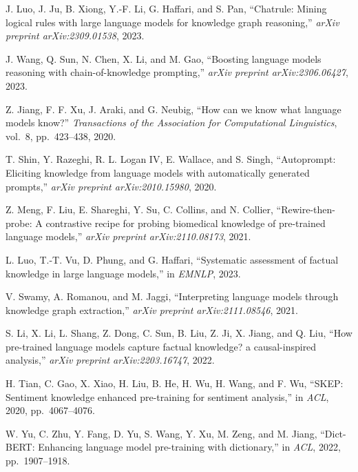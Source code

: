 \begin{enumerate}[leftmargin=2em,label={[\arabic*]}]
\item J. Luo, J. Ju, B. Xiong, Y.-F. Li, G. Haffari, and S. Pan, ``Chatrule: Mining logical rules with large language models for knowledge graph reasoning,'' \textit{arXiv preprint arXiv:2309.01538}, 2023.

\item J. Wang, Q. Sun, N. Chen, X. Li, and M. Gao, ``Boosting language models reasoning with chain-of-knowledge prompting,'' \textit{arXiv preprint arXiv:2306.06427}, 2023.

\item Z. Jiang, F. F. Xu, J. Araki, and G. Neubig, ``How can we know what language models know?'' \textit{Transactions of the Association for Computational Linguistics}, vol.~8, pp.~423--438, 2020.

\item T. Shin, Y. Razeghi, R. L. Logan IV, E. Wallace, and S. Singh, ``Autoprompt: Eliciting knowledge from language models with automatically generated prompts,'' \textit{arXiv preprint arXiv:2010.15980}, 2020.

\item Z. Meng, F. Liu, E. Shareghi, Y. Su, C. Collins, and N. Collier, ``Rewire-then-probe: A contrastive recipe for probing biomedical knowledge of pre-trained language models,'' \textit{arXiv preprint arXiv:2110.08173}, 2021.

\item L. Luo, T.-T. Vu, D. Phung, and G. Haffari, ``Systematic assessment of factual knowledge in large language models,'' in \textit{EMNLP}, 2023.

\item V. Swamy, A. Romanou, and M. Jaggi, ``Interpreting language models through knowledge graph extraction,'' \textit{arXiv preprint arXiv:2111.08546}, 2021.

\item S. Li, X. Li, L. Shang, Z. Dong, C. Sun, B. Liu, Z. Ji, X. Jiang, and Q. Liu, ``How pre-trained language models capture factual knowledge? a causal-inspired analysis,'' \textit{arXiv preprint arXiv:2203.16747}, 2022.

\item H. Tian, C. Gao, X. Xiao, H. Liu, B. He, H. Wu, H. Wang, and F. Wu, ``SKEP: Sentiment knowledge enhanced pre-training for sentiment analysis,'' in \textit{ACL}, 2020, pp.~4067--4076.

\item W. Yu, C. Zhu, Y. Fang, D. Yu, S. Wang, Y. Xu, M. Zeng, and M. Jiang, ``Dict-BERT: Enhancing language model pre-training with dictionary,'' in \textit{ACL}, 2022, pp.~1907--1918.


\end{enumerate}
